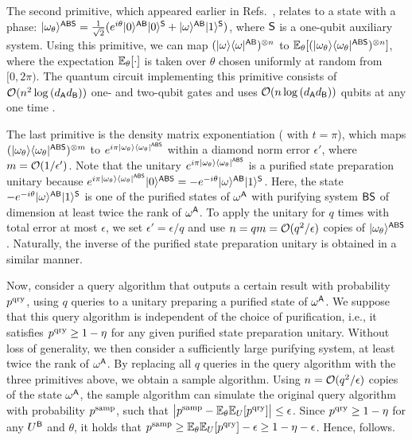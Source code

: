 The second primitive, which appeared earlier in Refs.~\cite{kretschmer2021pseudorandomnessclassical, Goldin2025translatingcommonhaar}, relates to a state with a phase: $|\omega_\theta\rangle^{{\mathsf{A}}{\mathsf{B}}{\mathsf{S}}} = \frac{1}{\sqrt{2}}(e^{i\theta}|0\rangle^{{\mathsf{A}}{\mathsf{B}}}|0\rangle^{{\mathsf{S}}} + |\omega\rangle^{{\mathsf{A}}{\mathsf{B}}}|1\rangle^{{\mathsf{S}}})$, where ${\mathsf{S}}$ is a one-qubit auxiliary system. 
Using this primitive, we can map $(|\omega\rangle\langle\omega|^{{\mathsf{A}}{\mathsf{B}}})^{\otimes n}$ to $\mathbb{E}_\theta[(|\omega_\theta\rangle\langle\omega_\theta|^{{\mathsf{A}}{\mathsf{B}}{\mathsf{S}}})^{\otimes n}]$, where the expectation $\mathbb{E}_\theta[\cdot]$ is taken over $\theta$ chosen uniformly at random from $[0, 2\pi)$. 
The quantum circuit implementing this primitive consists of ${\mathcal{O}}(n^2\log{(d_{\mathsf{A}}d_{\mathsf{B}})})$ one- and two-qubit gates and uses ${\mathcal{O}}(n\log{(d_{\mathsf{A}}d_{\mathsf{B}})})$ qubits at any one time \cite{tang2025conjugatequerieshelp}.


The last primitive is the density matrix exponentiation ( with $t=\pi$), which maps $(|\omega_\theta\rangle\langle\omega_\theta|^{{\mathsf{A}}{\mathsf{B}}{\mathsf{S}}})^{\otimes m}$ to $e^{i\pi |\omega_\theta\rangle\langle\omega_\theta|^{{\mathsf{A}}{\mathsf{B}}{\mathsf{S}}}}$ within a diamond norm error $\epsilon'$, where $m = {\mathcal{O}}(1/\epsilon')$. 
Note that the unitary $e^{i\pi |\omega_\theta\rangle\langle\omega_\theta|^{{\mathsf{A}}{\mathsf{B}}{\mathsf{S}}}}$ is a purified state preparation unitary because $e^{i\pi |\omega_\theta\rangle\langle\omega_\theta|^{{\mathsf{A}}{\mathsf{B}}{\mathsf{S}}}} |0\rangle^{{\mathsf{A}}{\mathsf{B}}{\mathsf{S}}} = -e^{-i\theta} |\omega\rangle^{{\mathsf{A}}{\mathsf{B}}} |1\rangle^{\mathsf{S}}$. Here, the state $-e^{-i\theta} |\omega\rangle^{{\mathsf{A}}{\mathsf{B}}} |1\rangle^{\mathsf{S}}$ is one of the purified states of $\omega^{\mathsf{A}}$ with purifying system ${\mathsf{B}}{\mathsf{S}}$ of dimension at least twice the rank of $\omega^{\mathsf{A}}$.
To apply the unitary for $q$ times with total error at most $\epsilon$, we set $\epsilon' = \epsilon/q$ and use $n = qm = {\mathcal{O}}(q^2/\epsilon)$ copies of $|\omega_\theta\rangle^{{\mathsf{A}}{\mathsf{B}}{\mathsf{S}}}$.
Naturally, the inverse of the purified state preparation unitary is obtained in a similar manner.


Now, consider a query algorithm that outputs a certain result with probability $p^{\rm qry}$, using $q$ queries to a unitary preparing a purified state of $\omega^{\mathsf{A}}$.
We suppose that this query algorithm is independent of the choice of purification, i.e., it satisfies $p^{\rm qry} \geq 1 - \eta$ for any given purified state preparation unitary.
Without loss of generality, we then consider a sufficiently large purifying system, at least twice the rank of $\omega^{\mathsf{A}}$.
By replacing all $q$ queries in the query algorithm with the three primitives above, we obtain a sample algorithm.
Using $n = {\mathcal{O}}(q^2/\epsilon)$ copies of the state $\omega^{\mathsf{A}}$, the sample algorithm can simulate the original query algorithm with probability $p^{\rm samp}$, such that $\big|p^{\rm samp} - \mathbb{E}_\theta\mathbb{E}_U [p^{\rm qry}]\big| \leq \epsilon$.
Since $p^{\rm qry} \geq 1 - \eta$ for any $U^{\mathsf{B}}$ and $\theta$, it holds that $p^{\rm samp} \geq \mathbb{E}_\theta \mathbb{E}_U [p^{\rm qry}] - \epsilon \ge 1 - \eta - \epsilon$.
Hence,  follows.





